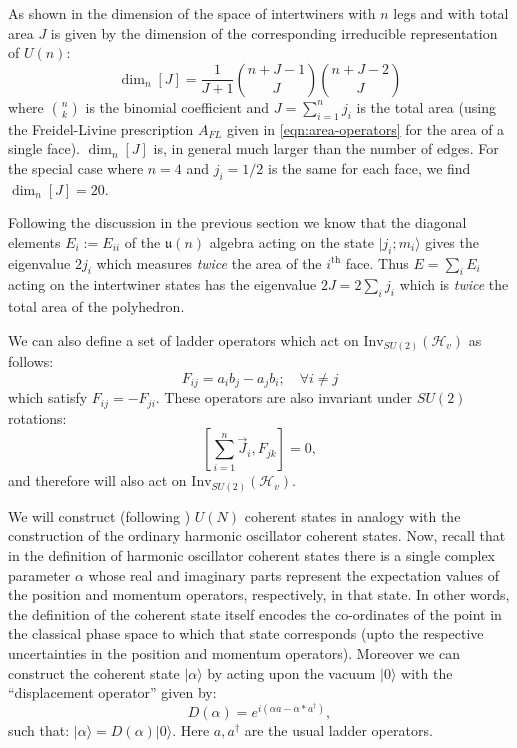 \documentclass[twocolumn,final,aps,nofootinbib,nobibnotes]{revtex4-2}
\newcommand{\mc}[1]{\mathcal{#1}}
\newcommand{\mf}[1]{\mathfrak{#1}}
\newcommand{\ket}[1]{\vert #1 \rangle}
\begin{document}
As shown in \cite{Freidel2009The-Fine} the dimension of the space of intertwiners with $ n $ legs and with total area $ J $ is given by the dimension of the corresponding irreducible representation of $ U(n) $:
\begin{equation}\label{eqn:intertwiner-dimension}
	\dim_n [J] = \frac{1}{J+1} \binom{n+J-1}{J} \binom{n+J-2}{J}
\end{equation}
where $ \binom{n}{k} $ is the binomial coefficient and $ J = \sum_{i=1}^n j_i $ is the total area (using the Freidel-Livine prescription $ A_{FL} $ given in \eqref{eqn:area-operators} for the area of a single face). $ \dim_n [J] $ is, in general much larger than the number of edges. For the special case where $ n = 4 $ and $ j_i = 1/2$ is the same for each face, we find $ \dim_n[J] = 20 $.

Following the discussion in the previous section we know that the diagonal elements $ E_i := E_{ii} $ of the $ \mf{u}(n) $ algebra acting on the state $ \ket{j_i;m_i} $ gives the eigenvalue $ 2 j_i $ which measures \textit{twice} the area of the $ i^\text{th} $ face. Thus $ E = \sum_i E_i $ acting on the intertwiner states has the eigenvalue $ 2 J = 2 \sum_i j_i $ which is \textit{twice} the total area of the polyhedron.

We can also define a set of ladder operators which act on $ \text{Inv}_{SU(2)}(\mc{H}_v) $ as follows:
\begin{equation}\label{eqn:u-n-ladder-ops}
	F_{ij} = a_i b_j - a_j b_i; \quad \forall i \ne j
\end{equation}
which satisfy $ F_{ij} = - F_{ji} $. These operators are also invariant under $ SU(2) $ rotations:
\begin{equation}\label{eqn:ladder-op-invariance}
	\left[ \sum_{i=1}^n \vec{J}_i, F_{jk} \right] = 0,
\end{equation}
and therefore will also act on $ \text{Inv}_{SU(2)}(\mc{H}_v) $.

We will construct (following \cite{Freidel2009The-Fine,Freidel2010UN-Coherent}) $ U(N) $ coherent states in analogy with the construction of the ordinary harmonic oscillator coherent states. Now, recall that in the definition of harmonic oscillator coherent states there is a single complex parameter $ \alpha $ whose real and imaginary parts represent the expectation values of the position and momentum operators, respectively, in that state. In other words, the definition of the coherent state itself encodes the co-ordinates of the point in the classical phase space to which that state corresponds (upto the respective uncertainties in the position and momentum operators). Moreover we can construct the coherent state $ \ket{\alpha} $ by acting upon the vacuum $ \ket{0} $ with the ``displacement operator'' given by:
\begin{equation}\label{eqn:displacement-op}
	D(\alpha) = e^{i(\alpha a - \alpha* a^\dag)},
\end{equation}
such that: $ \ket{\alpha} = D(\alpha) \ket{0} $. Here $ a, a^\dag $ are the usual ladder operators.
\end{document}
